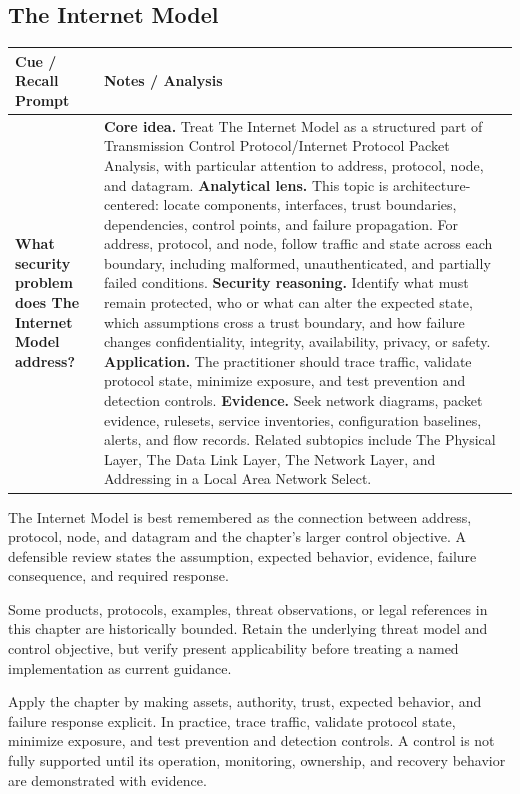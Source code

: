 \documentclass[11pt]{article}
\newcommand{\CornellHeader}{%
\rowcolor{Navy}\color{white}\bfseries Cue / Recall Prompt & \color{white}\bfseries Notes / Analysis\\\hline}
\newcommand{\CornellRow}[2]{%
\cellcolor{CueGray}\RaggedRight\textbf{#1} & \RaggedRight #2\\\hline}
\begin{document}
\subsection*{The Internet Model}
\begin{longtable}{>{\RaggedRight\arraybackslash}p{}|>{\RaggedRight\arraybackslash}p{}}
\CornellHeader
\CornellRow{What security problem does The Internet Model address?}{\textbf{Core idea.} Treat The Internet Model as a structured part of Transmission Control Protocol/Internet Protocol Packet Analysis, with particular attention to address, protocol, node, and datagram. \textbf{Analytical lens.} This topic is architecture-centered: locate components, interfaces, trust boundaries, dependencies, control points, and failure propagation. For address, protocol, and node, follow traffic and state across each boundary, including malformed, unauthenticated, and partially failed conditions. \textbf{Security reasoning.} Identify what must remain protected, who or what can alter the expected state, which assumptions cross a trust boundary, and how failure changes confidentiality, integrity, availability, privacy, or safety. \textbf{Application.} The practitioner should trace traffic, validate protocol state, minimize exposure, and test prevention and detection controls. \textbf{Evidence.} Seek network diagrams, packet evidence, rulesets, service inventories, configuration baselines, alerts, and flow records. Related subtopics include The Physical Layer, The Data Link Layer, The Network Layer, and Addressing in a Local Area Network Select.}
\end{longtable}
\begin{topicsummary}
The Internet Model is best remembered as the connection between address, protocol, node, and datagram and the chapter's larger control objective. A defensible review states the assumption, expected behavior, evidence, failure consequence, and required response.
\end{topicsummary}
\begin{historybox}
Some products, protocols, examples, threat observations, or legal references in this chapter are historically bounded. Retain the underlying threat model and control objective, but verify present applicability before treating a named implementation as current guidance.
\end{historybox}
\begin{defensebox}
Apply the chapter by making assets, authority, trust, expected behavior, and failure response explicit. In practice, trace traffic, validate protocol state, minimize exposure, and test prevention and detection controls. A control is not fully supported until its operation, monitoring, ownership, and recovery behavior are demonstrated with evidence.
\end{defensebox}
\end{document}
